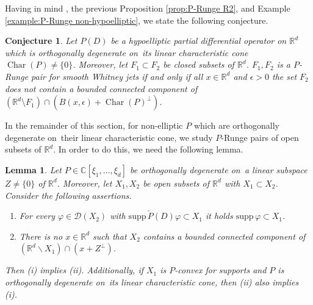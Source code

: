 \documentclass[a4paper,10pt]{amsart}
\newtheorem{lemma}[theorem]{Lemma}
\newtheorem{conjecture}[theorem]{Conjecture}
\newtheorem*{crucial lemma}{Lemma \ref{lem:nice polynomial2}}
\theoremstyle{definition}
\newcommand{\R}{\mathbb{R}}
\newcommand{\C}{\mathbb{C}}
\newcommand{\supp}{\mbox{supp}\,}
\newcommand{\charcone}{\operatorname{Char}}
\newcommand{\veryniceon}[1]{orthogonally degenerate on~#1}
\begin{document}
Having in mind \cite[Theorem 16, implication (iv)$\Rightarrow$(i)]{CiasKalmes2025}, the previous Proposition \ref{prop:P-Runge R2}, and Example \ref{example:P-Runge non-hypoelliptic}, we state the following conjecture.

\begin{conjecture}\label{conjecture:characterization of P-Runge}
	Let $P(D)$ be a hypoelliptic partial differential operator on $\R^d$ which is \veryniceon{its linear characteristic cone} $\charcone(P)\neq \{0\}$. Moreover, let $F_1\subset F_2$ be closed subsets of $\R^d$.
	$F_1,F_2$ is a $P$-Runge pair for smooth Whitney jets if and only if all $x\in\R^d$ and $\epsilon>0$ the set $F_2$ does not contain a bounded connected component of $(\R^d\setminus F_1)\cap (B(x,\epsilon)+\charcone(P)^\perp)$. 
\end{conjecture}

In the remainder of this section, for non-elliptic $P$ which are \veryniceon{their linear characteristic cone}, we study $P$-Runge pairs of open subsets of $\R^d$. In order to do this, we need the following lemma.




\begin{lemma}\label{lemma:preparation P-Runge pairs for open sets}
	Let $P\in\C[\xi_1,\ldots,\xi_d]$ be \veryniceon{a linear subspace $Z\neq\{0\}$ of $\R^d$}. Moreover, let $X_1, X_2$ be open subsets of $\R^d$ with $X_1\subset X_2$. Consider the following assertions.
	\begin{enumerate}
		\item[\upshape{(i)}] For every $\varphi\in\mathscr{D}(X_2)$ with $\supp\check{P}(D)\varphi\subset X_1$ it holds $\supp\varphi\subset X_1$.
		\item[\upshape{(ii)}] There is no $x\in\R^d$ such that $X_2$ contains a bounded connected component of $\left(\R^d\backslash X_1\right)\cap\left(x+Z^\perp\right)$.
	\end{enumerate}
	Then {\upshape(i)} implies {\upshape(ii)}. Additionally, if $X_1$ is $P$-convex for supports and $P$ is \veryniceon{its linear characteristic cone}, then {\upshape(ii)} also implies {\upshape(i)}.
\end{lemma}
\end{document}
